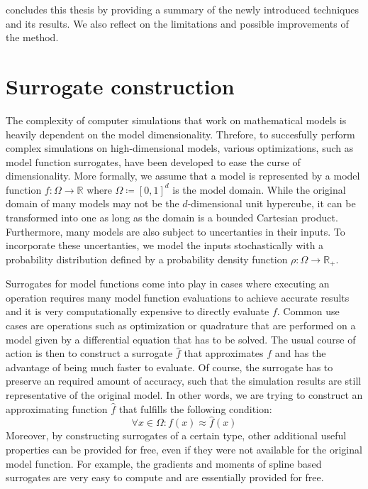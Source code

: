 \documentclass[
  a4paper,  %
  twoside,  %
  bibliography=totoc,
  headsepline,
  cleardoublepage=empty,
  parskip=half,
  draft=false
]{scrbook}
\begin{document}
 concludes this thesis by providing a summary of the newly introduced techniques and its results.
We also reflect on the limitations and possible improvements of the method.


\chapter{Surrogate construction}
\label{chap:c2}

The complexity of computer simulations that work on mathematical models is heavily dependent on the model dimensionality.
Threfore, to succesfully perform complex simulations on high-dimensional models, various optimizations, such as model function surrogates, have been developed to ease the curse of dimensionality.
More formally, we assume that a model is represented by a model function $f \colon \Omega \to \mathds{R}$ where $\Omega \coloneqq [0,1]^d$ is the model domain.
While the original domain of many models may not be the $d$-dimensional unit hypercube, it can be transformed into one as long as the domain is a bounded Cartesian product.
Furthermore, many models are also subject to uncertanties in their inputs.
To incorporate these uncertanties, we model the inputs stochastically with a probability distribution defined by a probability density function $\rho \colon \Omega \to \mathds{R_+}$.

Surrogates for model functions come into play in cases where executing an operation requires many model function evaluations to achieve accurate results and it is very computationally expensive to directly evaluate $f$.
Common use cases are operations such as optimization or quadrature that are performed on a model given by a differential equation that has to be solved.
The usual course of action is then to construct a surrogate $\hat{f}$ that approximates $f$ and has the advantage of being much faster to evaluate.
Of course, the surrogate has to preserve an required amount of accuracy, such that the simulation results are still representative of the original model.
In other words, we are trying to construct an approximating function $\hat{f}$ that fulfills the following condition:
\begin{equation}
\forall x \in \Omega \colon f(x) \approx \hat{f}(x)
\nonumber
\end{equation}
%
Moreover, by constructing surrogates of a certain type, other additional useful properties can be provided for free, even if they were not available for the original model function.
For example, the gradients and moments of spline based surrogates are very easy to compute and are essentially provided for free.
\end{document}
